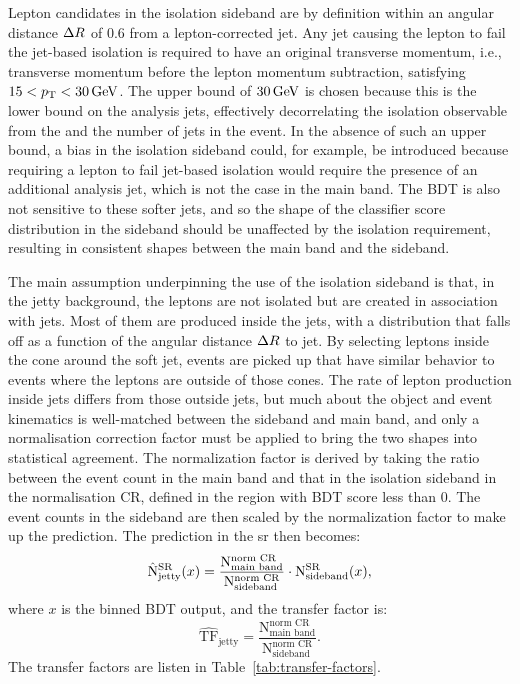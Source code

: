 Lepton candidates in the isolation sideband are by definition within an angular distance $\Delta R$ of 0.6 from a lepton-corrected jet. Any jet causing the lepton to fail the jet-based isolation is required to have an original transverse momentum, i.e., transverse momentum before the lepton momentum subtraction, satisfying $15<p_{\mathrm{T}}<30\,\text{Ge\hspace{-.08em}V}$. The upper bound of $30\,\text{Ge\hspace{-.08em}V}$ is chosen because this is the lower bound on the analysis jets, effectively decorrelating the isolation observable from the \mht and the number of jets in the event. In the absence of such an upper bound, a bias in the isolation sideband could, for example, be introduced because requiring a lepton to fail jet-based isolation would require the presence of an additional analysis jet, which is not the case in the main band. The BDT is also not sensitive to these softer jets, and so the shape of the classifier score distribution in the sideband should be unaffected by the isolation requirement, resulting in consistent shapes between the main band and the sideband.

The main assumption underpinning the use of the isolation sideband is that, in the jetty background, the leptons are not isolated but are created in association with jets. Most of them are produced inside the jets, with a distribution that falls off as a function of the angular distance $\Delta R$ to jet. By selecting leptons inside the cone around the soft jet, events are picked up that have similar behavior to events where the leptons are outside of those cones. The rate of lepton production inside jets differs from those outside jets, but much about the object and event kinematics is well-matched between the sideband and main band, and only a normalisation correction factor must be applied to bring the two shapes into statistical agreement. The normalization factor is derived by taking the ratio between the event count in the main band and that in the isolation sideband in the normalisation CR, defined in the region with BDT score less than 0. The event counts in the sideband are then scaled by the normalization factor to make up the prediction. The prediction in the \gls{sr} then becomes:
\begin{equation}
\hat{\mathrm{N}}^{\mathrm{SR}}_{\text{jetty}}\qty(x) = \frac{\mathrm{N}^{\text{norm CR}}_{\text{main band}}}{\mathrm{N}^{\text{norm CR}}_{\text{sideband}}} \cdot\mathrm{N}^{\mathrm{SR}}_{\text{sideband}}\qty(x),
\end{equation}
where $x$ is the binned BDT output, and the transfer factor is:
\begin{equation}
\hat{\mathrm{TF}}_{\text{jetty}} = \frac{\mathrm{N}^{\text{norm CR}}_{\text{main band}}}{\mathrm{N}^{\text{norm CR}}_{\text{sideband}}}.
\end{equation}
The transfer factors are listen in Table~\ref{tab:transfer-factors}.


